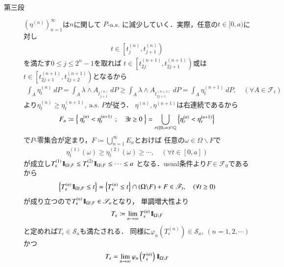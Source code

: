 \begin{prf}
\begin{description}
			\item[第三段]
				$\left( \eta^{(n)} \right)_{n=1}^\infty$は$n$に関して
				$P$-a.s. に減少していく．実際，任意の$t \in [0,a)$に対し
				\begin{align}
					t \in \left[t^{(n)}_j, t^{(n)}_{j+1}\right)
				\end{align}
				を満たす$0 \leq j \leq 2^n-1$を取れば
				$t \in \left[t^{(n+1)}_{2j}, t^{(n+1)}_{2j+1}\right)$或は
				$t \in \left[t^{(n+1)}_{2j+1}, t^{(n+1)}_{2j+2}\right)$となるから
				\begin{align}
					\int_A \eta^{(n)}_t\ dP
					= \int_A \lambda \wedge A_{t^{(n)}_{j+1}}\ dP
					\geq \int_A \lambda \wedge A_{t^{(n+1)}_{2j+1}}\ dP
					= \int_A \eta^{(n+1)}_t\ dP,
					\quad (\forall A \in \mathscr{F}_t)
				\end{align}
				より$\eta^{(n)}_t \geq \eta^{(n+1)}_t,\ \mbox{a.s. $P$}$が従う．
				$\eta^{(n)},\eta^{(n+1)}$は右連続であるから
				\begin{align}
					F_n \coloneqq \left\{\ \eta^{(n)}_t < \eta^{(n+1)}_t\ \, ; \quad \exists t \geq 0\ \right\}
					= \bigcup_{r \in [0,\infty) \cap \mathbb{Q}} \left\{\eta^{(n)}_r < \eta^{(n+1)}_r\right\}
				\end{align}
				で$P$-零集合が定まり，$F \coloneqq \bigcup_{n=1}^\infty E_n$とおけば
				任意の$\omega \in \Omega \backslash F$で
				\begin{align}
					\eta^{(1)}_t(\omega) \geq \eta^{(2)}_t(\omega) \geq \cdots,
					\quad (\forall t \in [0,a])
				\end{align}
				が成立し$T^{(1)}_\epsilon \mbox{1}\hspace{-0.25em}\mbox{l}_{\Omega \backslash F} 
				\leq T^{(2)}_\epsilon \mbox{1}\hspace{-0.25em}\mbox{l}_{\Omega \backslash F} \leq \cdots \leq a$
				となる．usual条件より$F \in \mathscr{F}_0$であるから
				\begin{align}
					\left\{ T^{(n)}_\epsilon \mbox{1}\hspace{-0.25em}\mbox{l}_{\Omega \backslash F} \leq t \right\}
					= \left\{ T^{(n)}_\epsilon \leq t \right\} \cap (\Omega \backslash F) + F
					\in \mathscr{F}_t,\quad (\forall t \geq 0)
				\end{align}
				が成り立つので$T^{(n)}_\epsilon \mbox{1}\hspace{-0.25em}\mbox{l}_{\Omega \backslash F} \in \mathscr{S}_a$となり，
				単調増大性より
				\begin{align}
					T_\epsilon \coloneqq \lim_{n \to \infty} T^{(n)}_\epsilon \mbox{1}\hspace{-0.25em}\mbox{l}_{\Omega \backslash F}
				\end{align}
				と定めれば$T_\epsilon \in \mathscr{S}_a$も満たされる．
				同様に$\varphi_n\left(T^{(n)}_\epsilon\right) \in \mathscr{S}_a,\ (n=1,2,\cdots)$かつ
				\begin{align}
					T_\epsilon = \lim_{n \to \infty} \varphi_n\left(T^{(n)}_\epsilon\right) \defunc_{\Omega \backslash F}

\end{align}
\end{description}
\end{prf}
